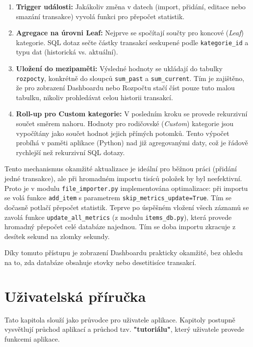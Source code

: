 \documentclass[
program=itk,
biblatex,
language=czech,
font=sans,
figures=true,
tables=false,
sourcecodes=false,
glossaries,
index
]{kidiplom}
\begin{document}
\begin{enumerate}
    \item \textbf{Trigger události:} Jakákoliv změna v datech (import, přidání, editace nebo smazání transakce) vyvolá funkci pro přepočet statistik.
    \item \textbf{Agregace na úrovni Leaf:} Nejprve se spočítají součty pro koncové (\textit{Leaf}) kategorie. SQL dotaz sečte částky transakcí seskupené podle \texttt{kategorie\_id} a typu dat (historická vs. aktuální).
    \item \textbf{Uložení do mezipaměti:} Výsledné hodnoty se ukládají do tabulky \texttt{rozpocty}, konkrétně do sloupců \texttt{sum\_past} a \texttt{sum\_current}. Tím je zajištěno, že pro zobrazení Dashboardu nebo Rozpočtu stačí číst pouze tuto malou tabulku, nikoliv prohledávat celou historii transakcí.
    \item \textbf{Roll-up pro Custom kategorie:} V posledním kroku se provede rekurzivní součet směrem nahoru. Hodnoty pro rodičovské (\textit{Custom}) kategorie jsou vypočítány jako součet hodnot jejich přímých potomků. Tento výpočet probíhá v paměti aplikace (Python) nad již agregovanými daty, což je řádově rychlejší než rekurzivní SQL dotazy.
\end{enumerate}

Tento mechanismus okamžité aktualizace je ideální pro běžnou práci (přidání jedné transakce), ale při hromadném importu tisíců položek by byl neefektivní. Proto je v modulu \texttt{file\_importer.py} implementována optimalizace: při importu se volá funkce \texttt{add\_item} s parametrem \texttt{skip\_metrics\_update=True}. Tím se dočasně potlačí přepočet statistik. Teprve po úspěšném vložení všech záznamů se zavolá funkce \texttt{update\_all\_metrics} (z modulu \texttt{items\_db.py}), která provede hromadný přepočet celé databáze najednou. Tím se doba importu zkracuje z desítek sekund na zlomky sekundy.

Díky tomuto přístupu je zobrazení Dashboardu prakticky okamžité, bez ohledu na to, zda databáze obsahuje stovky nebo desetitisíce transakcí.


\section{Uživatelská příručka}

Tato kapitola slouží jako průvodce pro uživatele aplikace. Kapitoly postupně vysvětlují průchod aplikací a průchod tzv. \textbf{"tutoriálu"}, který uživatele provede funkcemi aplikace. 
\end{document}
